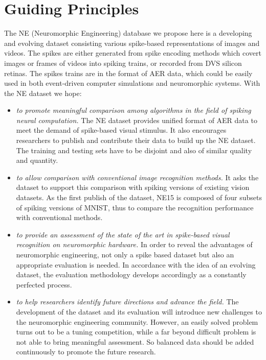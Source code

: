 \section{Guiding Principles}
\label{sec:guide}
The NE (Neuromorphic Engineering) database we propose here is a developing and evolving dataset consisting various spike-based representations of images and videos.
The spikes are either generated from spike encoding methods which covert images or frames of videos into spiking trains, or recorded from DVS silicon retinas.
The spikes trains are in the format of AER data, which could be easily used in both event-driven computer simulations and neuromorphic systems.
With the NE dataset we hope:
\begin{itemize}
	\item \textit{to promote meaningful comparison among algorithms in the field of spiking neural computation.}
	The NE dataset provides unified format of AER data to meet the demand of spike-based visual stimulus.
	It also encourages researchers to publish and contribute their data to build up the NE dataset.
	The training and testing sets have to be disjoint and also of similar quality and quantity.
	\item \textit{to allow comparison with conventional image recognition methods.}
	It asks the dataset to support this comparison with spiking versions of existing vision datasets.
	As the first publish of the dataset, NE15 is composed of four subsets of spiking versions of MNIST, thus to compare the recognition performance with conventional methods. 
	\item \textit{to provide an assessment of the state of the art in spike-based visual recognition on neuromorphic hardware.}
	In order to reveal the advantages of neuromorphic engineering, not only a spike based dataset but also an appropriate evaluation is needed.
	In accordance with the idea of an evolving dataset, the evaluation methodology develops accordingly as a constantly perfected process.
	\item \textit{to help researchers identify future directions and advance the field.}
	The development of the dataset and its evaluation will introduce new challenges to the neuromorphic engineering community.
	However, an easily solved problem turns out to be a tuning competition, while a far beyond difficult problem is not able to bring meaningful assessment.
	So balanced data should be added continuously to promote the future research.  
\end{itemize}

